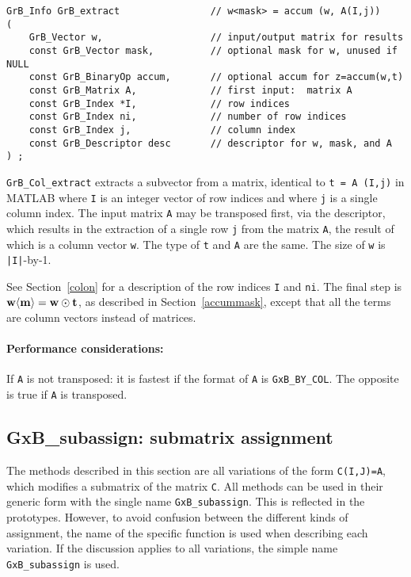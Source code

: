 \documentclass[12pt]{article}
\begin{document}
\begin{mdframed}[userdefinedwidth=6in]
{\footnotesize
\begin{verbatim}
GrB_Info GrB_extract                // w<mask> = accum (w, A(I,j))
(
    GrB_Vector w,                   // input/output matrix for results
    const GrB_Vector mask,          // optional mask for w, unused if NULL
    const GrB_BinaryOp accum,       // optional accum for z=accum(w,t)
    const GrB_Matrix A,             // first input:  matrix A
    const GrB_Index *I,             // row indices
    const GrB_Index ni,             // number of row indices
    const GrB_Index j,              // column index
    const GrB_Descriptor desc       // descriptor for w, mask, and A
) ;
\end{verbatim} } \end{mdframed}

\verb'GrB_Col_extract' extracts a subvector from a matrix, identical to
\verb't = A (I,j)' in MATLAB where \verb'I' is an integer vector of row indices
and where \verb'j' is a single column index.  The input matrix \verb'A' may be
transposed first, via the descriptor, which results in the extraction of a
single row \verb'j' from the matrix \verb'A', the result of which is a column
vector \verb'w'.  The type of \verb't' and \verb'A' are the same.
The size of \verb'w' is \verb'|I|'-by-1.

See Section~\ref{colon} for a description of the row indices
\verb'I' and \verb'ni'.
The final step is ${\bf w \langle m
\rangle  = w \odot t}$, as described in Section~\ref{accummask}, except that
all the terms are column vectors instead of matrices.

\paragraph{\bf Performance considerations:} %
If \verb'A' is not transposed: it is fastest if the format of \verb'A' is
\verb'GxB_BY_COL'.  The opposite is true if \verb'A' is transposed.

\newpage
\subsection{{\sf GxB\_subassign:} submatrix assignment} %
\label{subassign}

The methods described in this section are all variations of the form
\verb'C(I,J)=A', which modifies a submatrix of the matrix \verb'C'.  All
methods can be used in their generic form with the single name
\verb'GxB_subassign'.  This is reflected in the prototypes.  However, to avoid
confusion between the different kinds of assignment, the name of the specific
function is used when describing each variation.  If the discussion applies to
all variations, the simple name \verb'GxB_subassign' is used.
\end{document}
